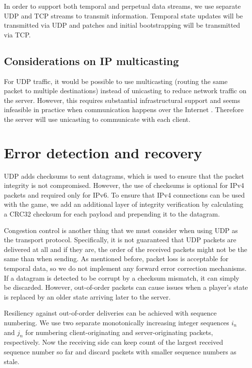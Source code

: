 \documentclass[sigconf, nonacm=true, natbib=false]{acmart}
\begin{document}
In order to support both temporal and perpetual data streams, we use separate UDP and TCP streams to transmit information.
Temporal state updates will be transmitted via UDP and patches and initial bootstrapping will be transmitted via TCP.

\subsection{Considerations on IP multicasting}

For UDP traffic, it would be possible to use multicasting (routing the same packet to multiple destinations) instead of
unicasting to reduce network traffic on the server. However, this requires substantial infrastructural support and seems
infeasible in practice when communication happens over the Internet \cite{Diot1}. Therefore the server will use
unicasting to communicate with each client.

\section{Error detection and recovery}

UDP adds checksums to sent datagrams, which is used to ensure that the packet integrity is not compromised. However,
the use of checksums is optional for IPv4 packets and required only for IPv6. \cite{rfc2460, rfc8085} To ensure that IPv4 connections
can be used with the game, we add an additional layer of integrity verification by calculating a CRC32 checksum for each
payload and prepending it to the datagram.

Congestion control is another thing that we must consider when using UDP as the transport protocol. Specifically, it is
not guaranteed that UDP packets are delivered at all and if they are, the order of the received packets might not be the
same than when sending. As mentioned before, packet loss is acceptable for temporal data, so we do not implement any
forward error correction mechanisms. If a datagram is detected to be corrupt by a checksum mismatch, it can simply be discarded.
However, out-of-order packets can cause issues when a player's state is replaced by an older state arriving later to the server.

Resiliency against out-of-order deliveries can be achieved with sequence numbering. We use two separate monotonically increasing
integer sequences $i_n$ and $j_n$ for numbering client-originating and server-originating packets, respectively. Now the receiving side
can keep count of the largest received sequence number so far and discard packets with smaller sequence numbers as stale.
\end{document}
